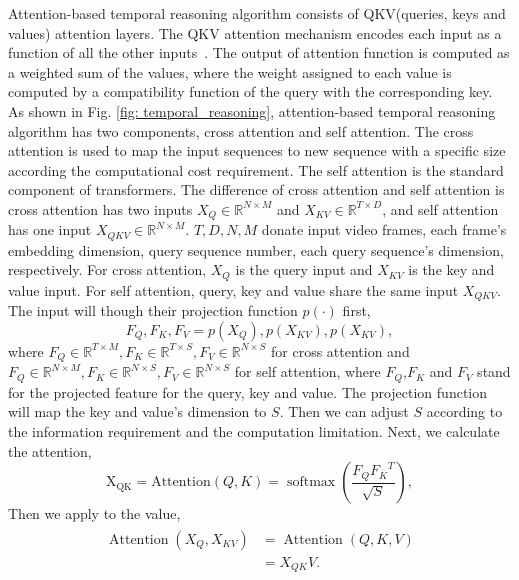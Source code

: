 \documentclass[letterpaper, 10 pt, conference]{ieeeconf}
\begin{document}
Attention-based temporal reasoning algorithm consists of QKV(queries, keys and values) attention layers. The QKV attention mechanism encodes each input as a function of all the other inputs~\cite{vaswani2017attention,jaegle2021perceiver}. The output of attention function is computed as a weighted sum of the values, where the weight assigned to each value is computed by a compatibility function of the query with the corresponding key\cite{vaswani2017attention}. As shown in Fig. \ref{fig: temporal_reasoning}, attention-based temporal reasoning algorithm has two components, cross attention and self attention. The cross attention is used to map the input sequences to new sequence with a specific size according the computational cost requirement. The self attention is the standard component of transformers\cite{vaswani2017attention}. The difference of cross attention and self attention is cross attention has two inputs $X_Q \in \mathbb{R}^{N \times M}$ and $X_{KV} \in \mathbb{R}^{T \times D}$, and self attention has one input $X_{QKV} \in \mathbb{R}^{N \times M}$. $T, D, N, M$ donate input video frames, each frame's embedding dimension, query sequence number, each query sequence's dimension, respectively. For cross attention, $X_Q$ is the query input and $X_{KV}$ is the key and value input. For self attention, query, key and value share the same input $X_{QKV}$.  The input will though their projection function $p(\cdot)$ first,
\begin{equation}
F_Q, F_K, F_V = p(X_Q), p(X_{KV}), p(X_{KV}),
\end{equation}
where $F_Q \in \mathbb{R}^{T \times M}, F_K \in \mathbb{R}^{T \times S}, F_V \in \mathbb{R}^{N \times S}$ for cross attention and $F_Q \in \mathbb{R}^{N \times M}, F_K \in \mathbb{R}^{N \times S}, F_V \in \mathbb{R}^{N \times S}$ for self attention, where $F_Q$,$F_K$ and $F_V$ stand for the projected feature for the query, key and value. The projection function will map the key and value's dimension to $S$. Then we can adjust $S$ according to the information requirement and the computation limitation. Next, we calculate the attention,
\begin{equation}
\operatorname{X_{QK}=Attention}(Q, K)=\operatorname{softmax}\left(\frac{F_Q {F_K}^T}{\sqrt{S}}\right),
\end{equation}
Then we apply to the value,
\begin{align}
\begin{split}
\operatorname{Attention}\left(X_Q, X_{K V}\right)&=\operatorname{Attention}(Q, K, V) \\
&=X_{QK} V .
\end{split}
\end{align}
\end{document}
